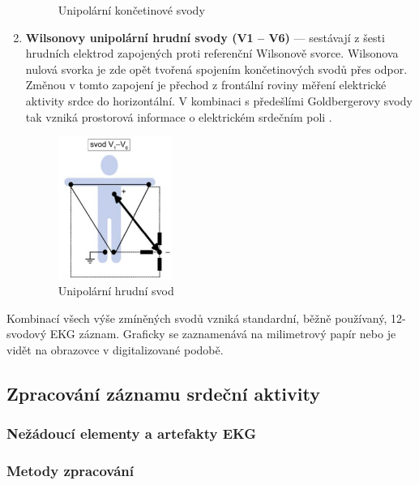 \begin{enumerate}
\begin{figure}[h]
\begin{center}
				\caption{Unipolární končetinové svody \cite{Kittnar2020}}
				\label{img:unipolar1}
			\end{center}
		\end{figure}
	\item \textbf{Wilsonovy unipolární hrudní svody (V1 -- V6)} --- sestávají z
		šesti hrudních elektrod zapojených proti referenční Wilsonově svorce.
		Wilsonova nulová svorka je zde opět tvořená spojením končetinových svodů
		přes odpor. Změnou v tomto zapojení je přechod z frontální roviny měření
		elektrické aktivity srdce do horizontální. V kombinaci s předešlími
		Goldbergerovy svody tak vzniká prostorová informace o elektrickém
		srdečním poli \cite{Kittnar2020}.
		\begin{figure}[h]
			\begin{center}
				\includegraphics[width=0.35\textwidth]{../assets/anatomy/unipolar2}
				\caption{Unipolární hrudní svod \cite{Kittnar2020}}
				\label{img:unipolar2}
			\end{center}
		\end{figure}
\end{enumerate}

Kombinací všech výše zmíněných svodů vzniká standardní, běžně používaný,
12-svodový EKG záznam. Graficky se zaznamenává na milimetrový papír nebo je
vidět na obrazovce v digitalizované podobě.


\subsection{Zpracování záznamu srdeční aktivity}
\subsubsection{Nežádoucí elementy a artefakty EKG}
\subsubsection{Metody zpracování}
